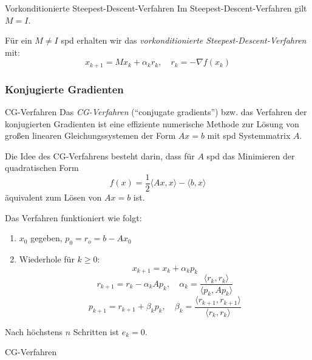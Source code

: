 \begin{bonus}{Vorkonditionierte Steepest-Descent-Verfahren}
    Im Steepest-Descent-Verfahren gilt $M = I$.

    Für ein $M \neq I$ spd erhalten wir das \emph{vorkonditionierte Steepest-Descent-Verfahren} mit:
    \[
        x_{k+1} = M x_k + \alpha_k r_k, \quad r_k = - \nabla f(x_k)
    \]
\end{bonus}

\subsubsection{Konjugierte Gradienten}

\begin{defi}{CG-Verfahren}
    Das \emph{CG-Verfahren} (\enquote{conjugate gradients}) bzw. das Verfahren der konjugierten Gradienten ist eine effiziente numerische Methode zur Lösung von großen linearen Gleichungssystemen der Form $A x = b$ mit spd Systemmatrix $A$.

    Die Idee des CG-Verfahrens besteht darin, dass für $A$ spd das Minimieren der quadratischen Form
    \[
        f(x) = \frac{1}{2} \langle Ax, x \rangle - \langle b, x \rangle
    \]
    äquivalent zum Lösen von $A x = b$ ist.

    Das Verfahren funktioniert wie folgt:
    \begin{enumerate}
        \item $x_0$ gegeben, $p_0 = r_o = b - Ax_0$
        \item Wiederhole für $k \geq 0$:
              \[ x_{k+1} = x_k + \alpha_k p_k \]
              \[ r_{k+1} = r_k - \alpha_k A p_k, \quad \alpha_k = \frac{\langle r_k, r_k \rangle}{\langle p_k, A p_k \rangle} \]
              \[ p_{k+1} = r_{k+1} + \beta_k p_k, \quad \beta_k = \frac{\langle r_{k+1}, r_{k+1} \rangle}{\langle r_k, r_k \rangle}\]
    \end{enumerate}

    Nach höchstens $n$ Schritten ist $e_k = 0$.
\end{defi}

\begin{example}{CG-Verfahren}

\end{example}


